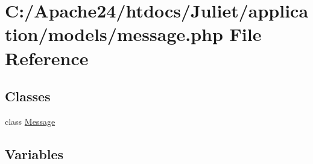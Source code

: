 \hypertarget{message_8php}{\section{C\-:/\-Apache24/htdocs/\-Juliet/application/models/message.php File Reference}
\label{message_8php}
}
\subsection*{Classes}
\begin{DoxyCompactItemize}
\item 
class \hyperlink{class_message}{Message}
\end{DoxyCompactItemize}
\subsection*{Variables}

